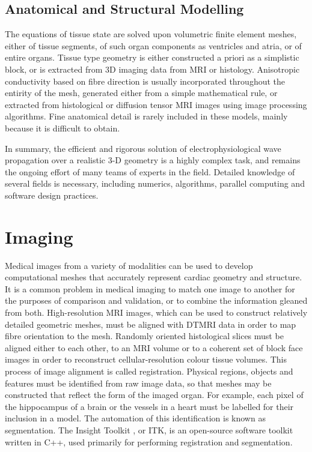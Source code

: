   \subsection{Anatomical and Structural Modelling}
  \label{sub:anatomical_and_structural_modelling}
    The equations of tissue state are solved upon volumetric finite element meshes, either of tissue segments, of such organ components as ventricles and atria, or of entire organs. Tissue type geometry is either constructed a priori as a simplistic block, or is extracted from 3D imaging data from MRI or histology. Anisotropic conductivity based on fibre direction is usually incorporated throughout the entirity of the mesh, generated either from a simple mathematical rule, or extracted from histological or diffusion tensor MRI images using image processing algorithms. Fine anatomical detail is rarely included in these models, mainly because it is difficult to obtain.
    
    In summary, the efficient and rigorous solution of electrophysiological wave propagation over a realistic 3-D geometry is a highly complex task, and remains the ongoing effort of many teams of experts in the field. Detailed knowledge of several fields is necessary, including numerics, algorithms, parallel computing and software design practices.

\section{Imaging}
\label{imaging}
  Medical images from a variety of modalities can be used to develop computational meshes that accurately represent cardiac geometry and structure. It is a common problem in medical imaging to match one image to another for the purposes of comparison and validation, or to combine the information gleaned from both. High-resolution MRI images, which can be used to construct relatively detailed geometric meshes, must be aligned with DTMRI data in order to map fibre orientation to the mesh. Randomly oriented histological slices must be aligned either to each other, to an MRI volume or to a coherent set of block face images in order to reconstruct cellular-resolution colour tissue volumes. This process of image alignment is called registration. Physical regions, objects and features must be identified from raw image data, so that meshes may be constructed that reflect the form of the imaged organ. For example, each pixel of the hippocampus of a brain or the vessels in a heart must be labelled for their inclusion in a model. The automation of this identification is known as segmentation. The Insight Toolkit \cite{Yoo2002}, or ITK, is an open-source software toolkit written in C++, used primarily for performing registration and segmentation.
  
